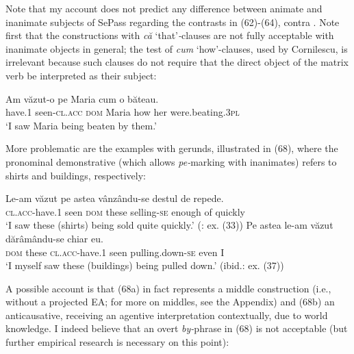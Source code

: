 \documentclass[output=paper]{langsci/langscibook}
\begin{document}
Note that my account does not predict any difference between animate and inanimate subjects of SePass regarding the contrasts in (62)-(64), contra \citet{Cornilescu1998}. Note first that the constructions with \textit{că} ‘that’\textit{{}-}clauses are not fully acceptable with inanimate objects in general; the test of \textit{cum} ‘how’-clauses, used by Cornilescu, is irrelevant because such clauses do not require that the direct object of the matrix verb be interpreted as their subject:

\ea%
    \label{ex:giurgea:67}
    \gll Am      văzut-o         pe     Maria cum o    băteau.\\
         have.\textsc{1} seen-\textsc{cl.acc} \textsc{dom} Maria how  her were.beating.\textsc{3pl}\\
    \glt ‘I saw Maria being beaten by them.’  
    \z


More problematic are the examples with gerunds, illustrated in (68), where the pronominal demonstrative (which allows \textit{pe-}marking with inanimates) refers to shirts and buildings, respectively: 

\ea%
    \label{ex:giurgea:68}
    \ea
    \gll Le-am              văzut pe    astea vânzându-se destul   de  repede.\\
         \textsc{cl.acc}{}-have.\textsc{1} seen  \textsc{dom} these selling-\textsc{se}      enough of  quickly      \\
    \glt ‘I saw these (shirts) being sold quite quickly.’ (\citealt{Cornilescu1998}: ex. (33))
    \ex
    \gll  Pe   astea  le-am               văzut dărâmându-se      chiar eu. \\
          \textsc{dom} these \textsc{cl.acc-}have.\textsc{1} seen  pulling.down-\textsc{se} even I     \\
    \glt ‘I myself saw these (buildings) being pulled down.’ (ibid.: ex. (37))
    \z
\z    

A possible account is that (68a) in fact represents a middle construction (i.e., without a projected EA; for more on middles, see the Appendix) and (68b) an anticausative, receiving an agentive interpretation contextually, due to world knowledge. I indeed believe that an overt \textit{by-}phrase in (68) is not acceptable (but further empirical research is necessary on this point):

    \z
\end{document}

